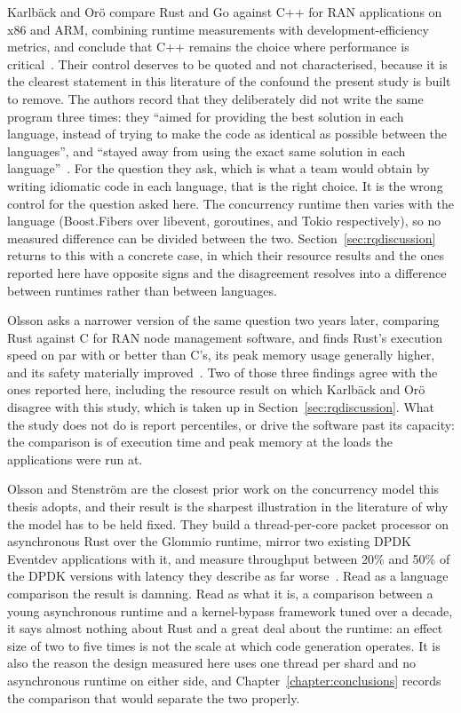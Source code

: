 \documentclass[english,twoside,openright,a4paper,censored,csm,software-track-2020]{HYthesisML}
\begin{document}
Karlb\"ack and Or\"o compare Rust and Go against C++ for RAN applications on x86 and ARM,
combining runtime measurements with development-efficiency metrics, and conclude that C++ remains
the choice where performance is critical~\cite{karlback2021ran}. Their control deserves to be
quoted and not characterised, because it is the clearest statement in this literature of the
confound the present study is built to remove. The authors record that they deliberately did not
write the same program three times: they ``aimed for providing the best solution in each language,
instead of trying to make the code as identical as possible between the languages'', and
``stayed away from using the exact same solution in each
language''~\cite{karlback2021ran}. For the question they ask, which is what a team would
obtain by writing idiomatic code in each language, that is the right choice. It is the wrong
control for the question asked here. The concurrency runtime then varies with the language
(Boost.Fibers over libevent, goroutines, and Tokio respectively), so no measured difference can
be divided between the two. Section~\ref{sec:rqdiscussion} returns to this with a concrete
case, in which their resource results and the ones reported here have opposite signs and the
disagreement resolves into a difference between runtimes rather than between languages.

Olsson asks a narrower version of the same question two years later, comparing Rust against C for
RAN node management software, and finds Rust's execution speed on par with or better than C's,
its peak memory usage generally higher, and its safety materially
improved~\cite{olsson2023ranmgmt}. Two of those three findings agree with the ones reported here,
including the resource result on which Karlb\"ack and Or\"o disagree with this study, which is
taken up in Section~\ref{sec:rqdiscussion}. What the study does not do is report percentiles, or
drive the software past its capacity: the comparison is of execution time and peak memory at the
loads the applications were run at.

Olsson and Stenstr\"om are the closest prior work on the concurrency model this thesis adopts,
and their result is the sharpest illustration in the literature of why the model has to be held
fixed. They build a thread-per-core packet processor on asynchronous Rust over the Glommio
runtime, mirror two existing DPDK Eventdev applications with it, and measure throughput between
20\% and 50\% of the DPDK versions with latency they describe as far
worse~\cite{olsson2023asyncpackets}. Read as a language comparison the result is damning. Read as
what it is, a comparison between a young asynchronous runtime and a kernel-bypass framework tuned
over a decade, it says almost nothing about Rust and a great deal about the runtime: an effect
size of two to five times is not the scale at which code generation operates. It is also the
reason the design measured here uses one thread per shard and no asynchronous runtime on either
side, and Chapter~\ref{chapter:conclusions} records the comparison that would separate the two
properly.
\end{document}
